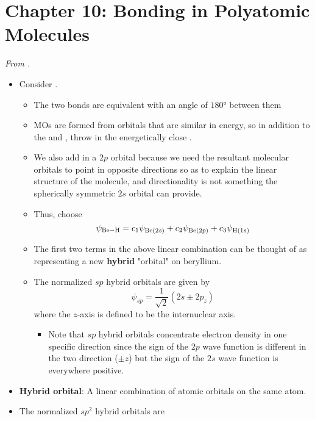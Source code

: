 \documentclass[../notes.tex]{subfiles}
\begin{document}
\section{Chapter 10: Bonding in Polyatomic Molecules}
\emph{From \textcite{bib:McQuarrieSimon}.}
\begin{itemize}
    \item Consider .
    \begin{itemize}
        \item The two  bonds are equivalent with an angle of $\ang{180}$ between them
        \item MOs are formed from orbitals that are similar in energy, so in addition to the  and , throw in the energetically close .
        \item We also add in a $2p$ orbital because we need the resultant molecular orbitals to point in opposite directions so as to explain the linear structure of the molecule, and directionality is not something the spherically symmetric $2s$ orbital can provide.
        \item Thus, choose
        \begin{equation*}
            \psi_{\ce{Be-H}} = c_1\psi_{\ce{Be($2s$)}}+c_2\psi_{\ce{Be($2p$)}}+c_3\psi_{\ce{H($1s$)}}
        \end{equation*}
        \item The first two terms in the above linear combination can be thought of as representing a new \textbf{hybrid} "orbital" on beryllium.
        \item The normalized $sp$ hybrid orbitals are given by
        \begin{equation*}
            \psi_{sp} = \frac{1}{\sqrt{2}}(2s\pm 2p_z)
        \end{equation*}
        where the $z$-axis is defined to be the internuclear  axis.
        \begin{itemize}
            \item Note that $sp$ hybrid orbitals concentrate electron density in one specific direction since the sign of the $2p$ wave function is different in the two direction ($\pm z$) but the sign of the $2s$ wave function is everywhere positive.
        \end{itemize}
    \end{itemize}
    \item \textbf{Hybrid orbital}: A linear combination of atomic orbitals on the same atom.
    \item The normalized $sp^2$ hybrid orbitals are

\end{itemize}
\end{document}
